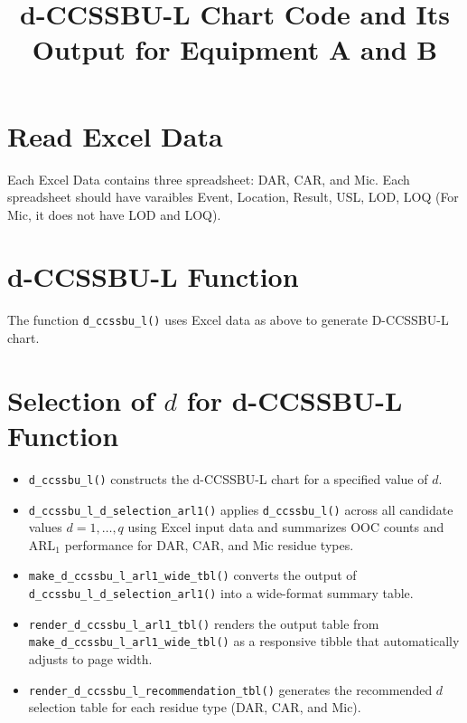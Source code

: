 \documentclass[
  12pt,
  letterpaper,
  DIV=11,
  numbers=noendperiod]{scrartcl}
\title{d-CCSSBU-L Chart Code and Its Output for Equipment A and B}
\author{}
\date{}
\begin{document}
\maketitle



\section{Read Excel Data}\label{read-excel-data}

Each Excel Data contains three spreadsheet: DAR, CAR, and Mic. Each
spreadsheet should have varaibles Event, Location, Result, USL, LOD, LOQ
(For Mic, it does not have LOD and LOQ).

\section{d-CCSSBU-L Function}\label{d-ccssbu-l-function}

The function \texttt{d\_ccssbu\_l()} uses Excel data as above to
generate D-CCSSBU-L chart.

\section{\texorpdfstring{Selection of \(d\) for d-CCSSBU-L
Function}{Selection of d for d-CCSSBU-L Function}}\label{selection-of-d-for-d-ccssbu-l-function}

\begin{itemize}
\item
  \texttt{d\_ccssbu\_l()} constructs the d-CCSSBU-L chart for a
  specified value of \(d\).
\item
  \texttt{d\_ccssbu\_l\_d\_selection\_arl1()} applies
  \texttt{d\_ccssbu\_l()} across all candidate values \(d=1,\ldots,q\)
  using Excel input data and summarizes OOC counts and ARL\(_1\)
  performance for DAR, CAR, and Mic residue types.
\item
  \texttt{make\_d\_ccssbu\_l\_arl1\_wide\_tbl()} converts the output of
  \texttt{d\_ccssbu\_l\_d\_selection\_arl1()} into a wide-format summary
  table.
\item
  \texttt{render\_d\_ccssbu\_l\_arl1\_tbl()} renders the output table
  from \texttt{make\_d\_ccssbu\_l\_arl1\_wide\_tbl()} as a responsive
  tibble that automatically adjusts to page width.
\item
  \texttt{render\_d\_ccssbu\_l\_recommendation\_tbl()} generates the
  recommended \(d\) selection table for each residue type (DAR, CAR, and
  Mic).
\end{itemize}
\end{document}
